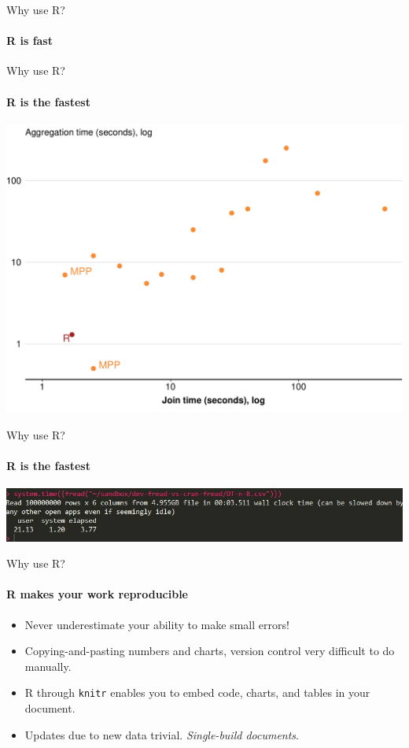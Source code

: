 \documentclass{grattan_pres}\usepackage[]{graphicx}\usepackage[]{color}
\begin{document}
\begin{frame}{Why use R?}
\framesubtitle{R is fast}
\end{frame}

\begin{frame}{Why use R?}
\framesubtitle{R is the fastest}
\includegraphics{sziliard-benchmark}
\end{frame}

\begin{frame}{Why use R?}
\framesubtitle{R is the fastest}
\includegraphics{MattDowle-gone-too-far.jpg}
\end{frame}

\begin{frame}{Why use R?}
\framesubtitle{R makes your work reproducible}
\begin{itemize}
\item[] Never underestimate your ability to make small errors!

\item[] Copying-and-pasting numbers and charts, version control very difficult to do manually.

\item[] R through \texttt{knitr} enables you to embed code, charts, and tables in your document.

\item[] Updates due to new data trivial. \emph{Single-build documents}.
\end{itemize}
\end{frame}
\end{document}
